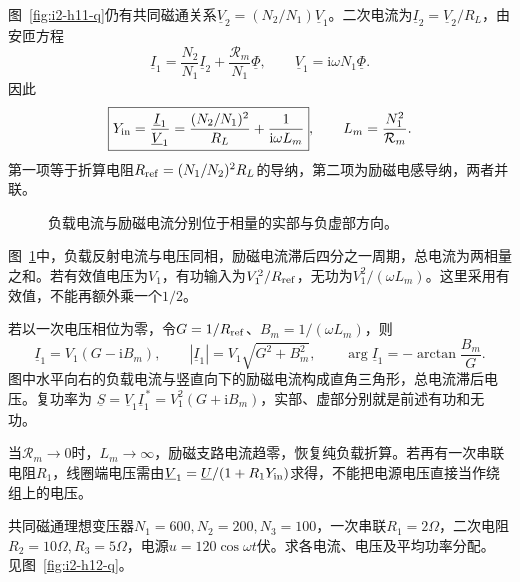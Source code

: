 \begin{solution}
图~\ref{fig:i2-h11-q}仍有共同磁通关系$\underline V_2=(N_2/N_1)\underline V_1$。二次电流为$\underline I_2=\underline V_2/R_L$，由安匝方程
\[\underline I_1=\frac{N_2}{N_1}\underline I_2+
\frac{\mathcal R_m}{N_1}\underline\Phi,\qquad
\underline V_1=\mathrm i\omega N_1\underline\Phi.
\]
因此
\[\boxed{Y_{\rm in}=\frac{\underline I_1}{\underline V_1}
=\frac{(N_2/N_1)^2}{R_L}+
\frac1{\mathrm i\omega L_m}},\qquad L_m=\frac{N_1^2}{\mathcal R_m}.
\]
第一项等于折算电阻$R_{\rm ref}=(N_1/N_2)^2R_L$的导纳，第二项为励磁电感导纳，两者并联。


\begin{figure}[H]\centering
{}
\caption{负载电流与励磁电流分别位于相量的实部与负虚部方向。}\label{fig:i2-h11-s}
\end{figure}

图~\ref{fig:i2-h11-s}中，负载反射电流与电压同相，励磁电流滞后四分之一周期，总电流为两相量之和。若有效值电压为$V_1$，有功输入为$V_1^2/R_{\rm ref}$，无功为$V_1^2/(\omega L_m)$。这里采用有效值，不能再额外乘一个$1/2$。

若以一次电压相位为零，令$G=1/R_{\rm ref}$、$B_m=1/(\omega L_m)$，则
\[
\underline I_1=V_1(G-\mathrm iB_m),\qquad
|\underline I_1|=V_1\sqrt{G^2+B_m^2},\qquad
\arg\underline I_1=-\arctan\frac{B_m}{G}.
\]
图中水平向右的负载电流与竖直向下的励磁电流构成直角三角形，总电流滞后电压。复功率为
$\underline S=\underline V_1\underline I_1^{\,*}=V_1^2(G+\mathrm iB_m)$，实部、虚部分别就是前述有功和无功。

当$\mathcal R_m\to0$时，$L_m\to\infty$，励磁支路电流趋零，恢复纯负载折算。若再有一次串联电阻$R_1$，线圈端电压需由$\underline V_1=\underline U/(1+R_1Y_{\rm in})$求得，不能把电源电压直接当作绕组上的电压。
\end{solution}

\begin{exercise}[共同磁通三绕组的数值计算]\label{ex:i2-h12}
共同磁通理想变压器$N_1=600,N_2=200,N_3=100$，一次串联$R_1=2\Omega$，二次电阻$R_2=10\Omega,R_3=5\Omega$，电源$u=120\cos\omega t$伏。求各电流、电压及平均功率分配。 见图~\ref{fig:i2-h12-q}。
\end{exercise}

